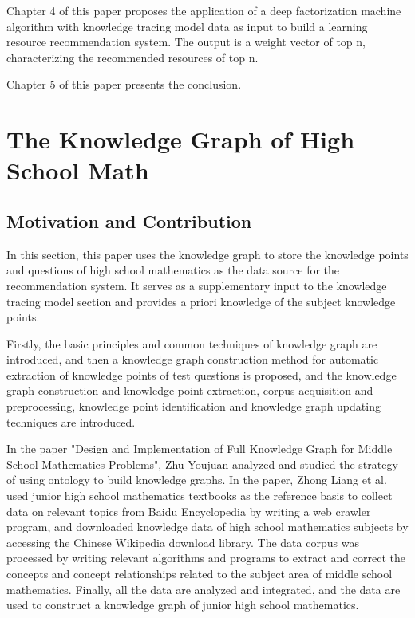 \documentclass[11pt,en]{elegantpaper}
\begin{document}
Chapter 4 of this paper proposes the application of a deep factorization machine algorithm with knowledge tracing model data as input to build a learning resource recommendation system. The output is a weight vector of top n, characterizing the recommended resources of top n.

Chapter 5 of this paper presents the conclusion.

\clearpage
\section{The Knowledge Graph of High School Math}
\subsection{Motivation and Contribution}
In this section, this paper uses the knowledge graph to store the knowledge points and questions of high school mathematics as the data source for the recommendation system. It serves as a supplementary input to the knowledge tracing model section and provides a priori knowledge of the subject knowledge points.

Firstly, the basic principles and common techniques of knowledge graph are introduced, and then a knowledge graph construction method for automatic extraction of knowledge points of test questions is proposed, and the knowledge graph construction and knowledge point extraction, corpus acquisition and preprocessing, knowledge point identification and knowledge graph updating techniques are introduced.

In the paper "Design and Implementation of Full Knowledge Graph for Middle School Mathematics Problems", Zhu Youjuan analyzed and studied the strategy of using ontology to build knowledge graphs. In the paper, Zhong Liang et al. used junior high school mathematics textbooks as the reference basis to collect data on relevant topics from Baidu Encyclopedia by writing a web crawler program, and downloaded knowledge data of high school mathematics subjects by accessing the Chinese Wikipedia download library. The data corpus was processed by writing relevant algorithms and programs to extract and correct the concepts and concept relationships related to the subject area of middle school mathematics. Finally, all the data are analyzed and integrated, and the data are used to construct a knowledge graph of junior high school mathematics.
\end{document}
